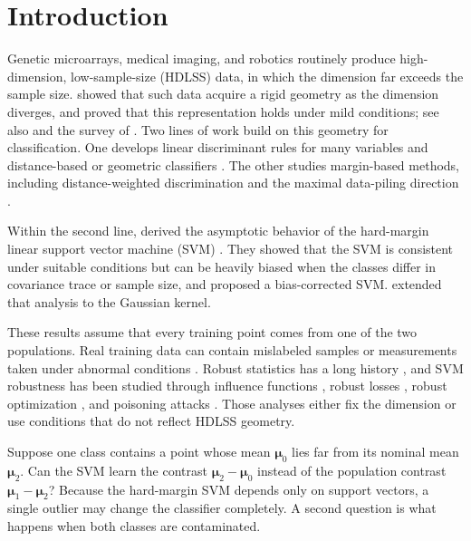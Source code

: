 \section{Introduction}

Genetic microarrays, medical imaging, and robotics routinely produce high-dimension, low-sample-size (HDLSS) data, in which the dimension far exceeds the sample size. \citet{hall2005} showed that such data acquire a rigid geometry as the dimension diverges, and \citet{ahn2007} proved that this representation holds under mild conditions; see also \citet{jung2009} and the survey of \citet{aoshima2018}. Two lines of work build on this geometry for classification. One develops linear discriminant rules for many variables \citep{bickel2004,fan2008} and distance-based or geometric classifiers \citep{hall2008,chan2009,aoshima2011,aoshima2014,aoshima2015,aoshima2019}. The other studies margin-based methods, including distance-weighted discrimination \citep{marron2007,qiao2010} and the maximal data-piling direction \citep{ahn2010}.

Within the second line, \citet{nakayama2017} derived the asymptotic behavior of the hard-margin linear support vector machine (SVM) \citep{cortes1995,vapnik2000}. They showed that the SVM is consistent under suitable conditions but can be heavily biased when the classes differ in covariance trace or sample size, and proposed a bias-corrected SVM. \citet{nakayama2020} extended that analysis to the Gaussian kernel.

These results assume that every training point comes from one of the two populations. Real training data can contain mislabeled samples or measurements taken under abnormal conditions \citep{frenay2014}. Robust statistics has a long history \citep{huber1964,hampel1986,rousseeuw1987}, and SVM robustness has been studied through influence functions \citep{christmann2004,steinwart2008}, robust losses \citep{wu2007}, robust optimization \citep{xu2009}, and poisoning attacks \citep{biggio2012}. Those analyses either fix the dimension or use conditions that do not reflect HDLSS geometry.

Suppose one class contains a point whose mean $\boldsymbol\mu_0$ lies far from its nominal mean $\boldsymbol\mu_2$. Can the SVM learn the contrast $\boldsymbol\mu_2-\boldsymbol\mu_0$ instead of the population contrast $\boldsymbol\mu_1-\boldsymbol\mu_2$? Because the hard-margin SVM depends only on support vectors, a single outlier may change the classifier completely. A second question is what happens when both classes are contaminated.

